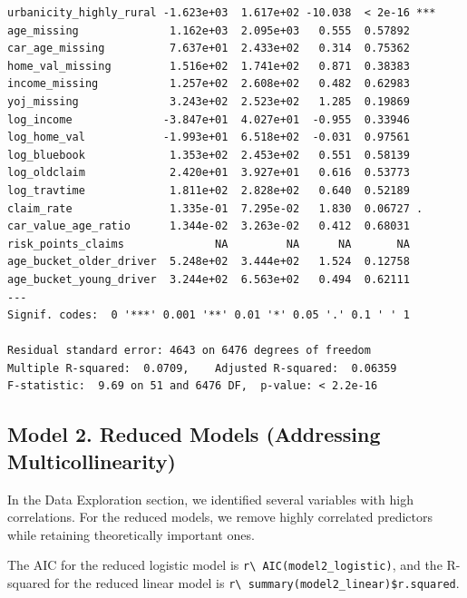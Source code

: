 \documentclass[
  11pt]{article}
\begin{document}
\begin{verbatim}
urbanicity_highly_rural -1.623e+03  1.617e+02 -10.038  < 2e-16 ***
age_missing              1.162e+03  2.095e+03   0.555  0.57892    
car_age_missing          7.637e+01  2.433e+02   0.314  0.75362    
home_val_missing         1.516e+02  1.741e+02   0.871  0.38383    
income_missing           1.257e+02  2.608e+02   0.482  0.62983    
yoj_missing              3.243e+02  2.523e+02   1.285  0.19869    
log_income              -3.847e+01  4.027e+01  -0.955  0.33946    
log_home_val            -1.993e+01  6.518e+02  -0.031  0.97561    
log_bluebook             1.353e+02  2.453e+02   0.551  0.58139    
log_oldclaim             2.420e+01  3.927e+01   0.616  0.53773    
log_travtime             1.811e+02  2.828e+02   0.640  0.52189    
claim_rate               1.335e-01  7.295e-02   1.830  0.06727 .  
car_value_age_ratio      1.344e-02  3.263e-02   0.412  0.68031    
risk_points_claims              NA         NA      NA       NA    
age_bucket_older_driver  5.248e+02  3.444e+02   1.524  0.12758    
age_bucket_young_driver  3.244e+02  6.563e+02   0.494  0.62111    
---
Signif. codes:  0 '***' 0.001 '**' 0.01 '*' 0.05 '.' 0.1 ' ' 1

Residual standard error: 4643 on 6476 degrees of freedom
Multiple R-squared:  0.0709,    Adjusted R-squared:  0.06359 
F-statistic:  9.69 on 51 and 6476 DF,  p-value: < 2.2e-16
\end{verbatim}

\subsection{Model 2. Reduced Models (Addressing
Multicollinearity)}\label{model-2.-reduced-models-addressing-multicollinearity}

In the Data Exploration section, we identified several variables with
high correlations. For the reduced models, we remove highly correlated
predictors while retaining theoretically important ones.

The AIC for the reduced logistic model is
\texttt{r\textbackslash{}\ AIC(model2\_logistic)}, and the R-squared for
the reduced linear model is
\texttt{r\textbackslash{}\ summary(model2\_linear)\$r.squared}.
\end{document}
